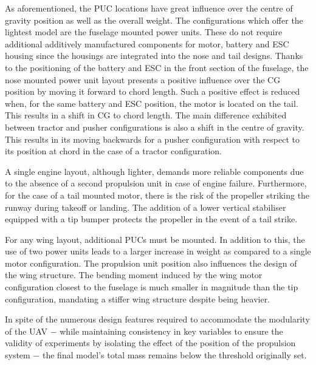 \documentclass[../../main.tex]{subfiles}
\begin{document}
As aforementioned, the PUC locations have great influence over the centre of gravity position as well as the overall weight.
The configurations which offer the lightest model are the fuselage mounted power units.
These do not require additional additively manufactured components for motor, battery and ESC housing since the housings are integrated into the nose and tail designs.
Thanks to the positioning of the battery and ESC in the front section of the fuselage, the nose mounted power unit layout presents a positive influence over the CG position by moving it forward to  chord length.
Such a positive effect is reduced when, for the same battery and ESC position, the motor is located on the tail.
This results in a shift in CG to  chord length.
The main difference exhibited between tractor and pusher configurations is also a shift in the centre of gravity.
This results in its moving backwards for a pusher configuration with respect to its position at  chord in the case of a tractor configuration.

A single engine layout, although lighter, demands more reliable components due to the absence of a second propulsion unit in case of engine failure.
Furthermore, for the case of a tail mounted motor, there is the risk of the propeller striking the runway during takeoff or landing.
The addition of a lower vertical stabiliser equipped with a tip bumper protects the propeller in the event of a tail strike. 

For any wing layout, additional PUCs must be mounted.
In addition to this, the use of two power units leads to a larger increase in weight as compared to a single motor configuration.
The propulsion unit position also influences the design of the wing structure.
The bending moment induced by the wing motor configuration closest to the fuselage is much smaller in magnitude than the tip configuration, mandating a stiffer wing structure despite being heavier.

In spite of the numerous design features required to accommodate the modularity of the UAV $-$ while maintaining consistency in key variables to ensure the validity of experiments by isolating the effect of the position of the propulsion system $-$ the final model's total mass remains below the  threshold originally set.
\end{document}

